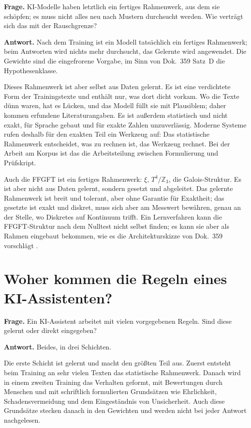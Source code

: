 \textbf{Frage.} KI-Modelle haben letztlich ein fertiges Rahmenwerk, aus dem sie schöpfen; es muss
nicht alles neu nach Mustern durchsucht werden. Wie verträgt sich das mit der Rauschgrenze?

\textbf{Antwort.} Nach dem Training ist ein Modell tatsächlich ein fertiges Rahmenwerk; beim Antworten
wird nichts mehr durchsucht, das Gelernte wird angewendet. Die Gewichte sind die eingefrorene
Vorgabe, im Sinn von Dok.~359 Satz~D die Hypothesenklasse.

Dieses Rahmenwerk ist aber selbst aus Daten gelernt. Es ist eine verdichtete Form der Trainingstexte
und enthält nur, was dort dicht vorkam. Wo die Texte dünn waren, hat es Lücken, und das Modell füllt
sie mit Plausiblem; daher kommen erfundene Literaturangaben. Es ist außerdem statistisch und nicht
exakt, für Sprache gebaut und für exakte Zahlen unzuverlässig. Moderne Systeme rufen deshalb für den
exakten Teil ein Werkzeug auf: Das statistische Rahmenwerk entscheidet, was zu rechnen ist, das
Werkzeug rechnet. Bei der Arbeit am Korpus ist das die Arbeitsteilung zwischen Formulierung und
Prüfskript.

Auch die FFGFT ist ein fertiges Rahmenwerk: $\xi$, $T^4/\mathbb Z_3$, die Galois-Struktur. Es ist
aber nicht aus Daten gelernt, sondern gesetzt und abgeleitet. Das gelernte Rahmenwerk ist breit und
tolerant, aber ohne Garantie für Exaktheit; das gesetzte ist exakt und diskret, muss sich aber am
Messwert bewähren, genau an der Stelle, wo Diskretes auf Kontinuum trifft. Ein Lernverfahren kann
die FFGFT-Struktur nach dem Nulltest nicht selbst finden; es kann sie aber als Rahmen eingebaut
bekommen, wie es die Architekturskizze von Dok.~359 vorschlägt \SM.

\section{Woher kommen die Regeln eines KI-Assistenten?}

\textbf{Frage.} Ein KI-Assistent arbeitet mit vielen vorgegebenen Regeln. Sind diese gelernt oder
direkt eingegeben?

\textbf{Antwort.} Beides, in drei Schichten.

Die erste Schicht ist gelernt und macht den größten Teil aus. Zuerst entsteht beim Training an sehr
vielen Texten das statistische Rahmenwerk. Danach wird in einem zweiten Training das Verhalten
geformt, mit Bewertungen durch Menschen und mit schriftlich formulierten Grundsätzen wie Ehrlichkeit,
Schadensvermeidung und dem Eingeständnis von Unsicherheit. Auch diese Grundsätze stecken danach in den
Gewichten und werden nicht bei jeder Antwort nachgelesen.

